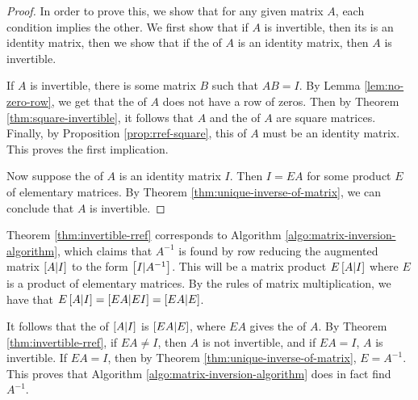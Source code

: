 \begin{proof}
In order to prove this, we show that for any given matrix $A$, each condition implies the other. We first show that if $A$ is invertible, then its {\rref} is an identity matrix, then we show that if the {\rref} of $A$ is an identity matrix, then $A$ is invertible. 

If $A$ is invertible, there is some matrix $B$ such that $AB = I$. By Lemma \ref{lem:no-zero-row}, we get that the {\rref} of $A$ does not have a row of zeros. Then by Theorem \ref{thm:square-invertible}, it follows that $A$ and the {\rref} of $A$ are square matrices. Finally, by Proposition \ref{prop:rref-square}, this {\rref} of $A$ must be an identity matrix. This proves the first implication.

Now suppose the {\rref} of $A$ is an identity matrix $I$. Then $I=EA$ for some product $E$ of elementary matrices. By Theorem \ref{thm:unique-inverse-of-matrix}, we can conclude that $A$ is invertible.
\end{proof}

Theorem \ref{thm:invertible-rref} corresponds to Algorithm \ref{algo:matrix-inversion-algorithm}, which claims that $A^{-1}$ is found by row reducing the augmented matrix $\left[A|I\right]$ to the form $\left[I|A^{-1}\right]$. This will be a matrix product $E\left[A|I\right]$ where $E$ is a product of elementary matrices. By the rules of matrix multiplication, we have that $E\left[A|I\right] = \left[EA|EI\right] = \left[EA|E\right]$.

It follows that the {\rref} of $\left[A|I\right]$ is $\left[EA|E\right]$, where $EA$ gives the {\rref} of $A$. By Theorem \ref{thm:invertible-rref}, if $EA \neq I$, then $A$ is not invertible, and if $EA=I$, $A$ is invertible. If $EA=I$, then by Theorem \ref{thm:unique-inverse-of-matrix}, $E=A^{-1}$. This proves that Algorithm \ref{algo:matrix-inversion-algorithm} does in fact find $A^{-1}$.
